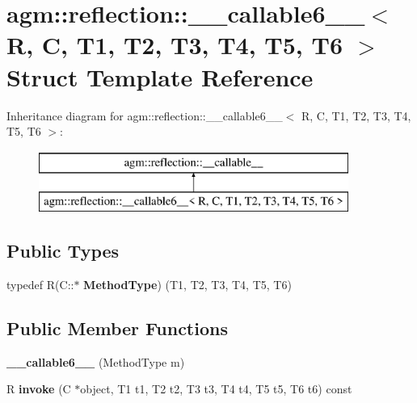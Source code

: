 \hypertarget{structagm_1_1reflection_1_1____callable6____}{}\section{agm\+:\+:reflection\+:\+:\+\_\+\+\_\+callable6\+\_\+\+\_\+$<$ R, C, T1, T2, T3, T4, T5, T6 $>$ Struct Template Reference}
\label{structagm_1_1reflection_1_1____callable6____}
Inheritance diagram for agm\+:\+:reflection\+:\+:\+\_\+\+\_\+callable6\+\_\+\+\_\+$<$ R, C, T1, T2, T3, T4, T5, T6 $>$\+:\begin{figure}[H]
\begin{center}
\leavevmode
\includegraphics[height=2.000000cm]{structagm_1_1reflection_1_1____callable6____}
\end{center}
\end{figure}
\subsection*{Public Types}
\begin{DoxyCompactItemize}
\item 
typedef R(C\+::$\ast$ {\bfseries Method\+Type}) (T1, T2, T3, T4, T5, T6)\hypertarget{structagm_1_1reflection_1_1____callable6_____af146745859fc0258e5d9e8b82b9d9f24}{}\label{structagm_1_1reflection_1_1____callable6_____af146745859fc0258e5d9e8b82b9d9f24}

\end{DoxyCompactItemize}
\subsection*{Public Member Functions}
\begin{DoxyCompactItemize}
\item 
{\bfseries \+\_\+\+\_\+callable6\+\_\+\+\_\+} (Method\+Type m)\hypertarget{structagm_1_1reflection_1_1____callable6_____a420682dc3a0f2b001b3860f2593a05f3}{}\label{structagm_1_1reflection_1_1____callable6_____a420682dc3a0f2b001b3860f2593a05f3}

\item 
R {\bfseries invoke} (C $\ast$object, T1 t1, T2 t2, T3 t3, T4 t4, T5 t5, T6 t6) const \hypertarget{structagm_1_1reflection_1_1____callable6_____ae172c9e46e7ead90d731389db54a0e87}{}\label{structagm_1_1reflection_1_1____callable6_____ae172c9e46e7ead90d731389db54a0e87}

\end{DoxyCompactItemize}
